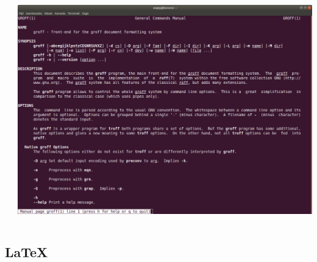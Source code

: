 \documentclass[usenames,dvipsnames,aspectratio=169]{beamer}
\begin{document}
\begin{frame}
  \begin{columns}[c]
      \tiny
      \begin{exampleblock}{}
        
        
      \end{exampleblock}
      \includegraphics[width=\linewidth]{./groff.png}
  \end{columns}
\end{frame}

\subsection{\LaTeX{}}
\end{document}
